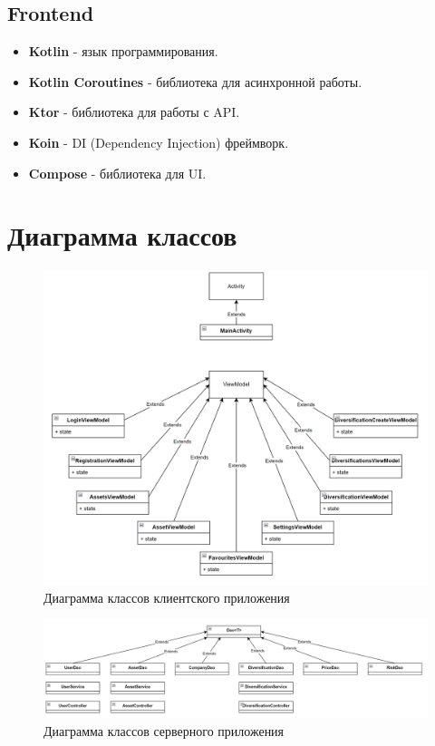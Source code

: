 \documentclass[a4paper, 14pt]{article}
\begin{document}
\subsection{Frontend}

\begin{itemize}
    \item \textbf{Kotlin} - язык программирования.
    \item \textbf{Kotlin Coroutines} - библиотека для асинхронной работы.
    \item \textbf{Ktor} - библиотека для работы с API.
    \item \textbf{Koin} - DI (Dependency Injection) фреймворк.
    \item \textbf{Compose} - библиотека для UI.
\end{itemize}

\section{Диаграмма классов}

\begin{figure}[H]
    \centering
    \includegraphics[width=17cm]{resources/15.png}
    \caption{Диаграмма классов клиентского приложения}
\end{figure}

\begin{figure}[H]
    \centering
    \includegraphics[width=17cm]{resources/16.png}
    \caption{Диаграмма классов серверного приложения}
\end{figure}
\end{document}
